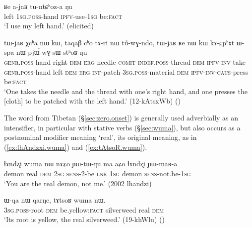 \begin{exe}
\ex \label{ex:Re.ajaR}
\gll ʁe a-jaʁ tu-ntɕʰoz-a ŋu \\
left \textsc{1sg}.\textsc{poss}-hand \textsc{ipfv}-use-\textsc{1sg} be:\textsc{fact} \\
\glt `I use my left hand.' (elicited)
\end{exe}


\begin{exe}
\ex \label{ex:tWjaR.Xcha}
\gll tɯ-jaʁ χcʰa nɯ kɯ, taqaβ cʰo tɤ-ri nɯ tú-wɣ-ndo, tɯ-jaʁ ʁe nɯ kɯ kɤ-ɕpʰɤt ɯ-spa nɯ pjɯ́-wɣ-sɯ-stʰoʁ ŋu \\
\textsc{genr}.\textsc{poss}-hand right \textsc{dem} \textsc{erg} needle \textsc{comit}  \textsc{indef}.\textsc{poss}-thread \textsc{dem} \textsc{ipfv}-\textsc{inv}-take \textsc{genr}.\textsc{poss}-hand left \textsc{dem} \textsc{erg} \textsc{inf}-patch \textsc{3sg}.\textsc{poss}-material \textsc{dem} \textsc{ipfv}-\textsc{inv}-\textsc{caus}-press be:\textsc{fact} \\
\glt `One takes the needle and the thread with one's right hand, and one presses the [cloth] to be patched with the left hand.' (12-kAtsxWb)
()
\end{exe}


The word  from Tibetan  (§\ref{sec:zero.onset}) is generally used adverbially as an intensifier, in particular with stative verbs (§\ref{sec:wuma}), but also occurs as a postnominal modifier meaning `real', its original meaning, as in (\ref{ex:lhAndzxi.wuma}) and (\ref{ex:tAtsoR.wuma}).

\begin{exe}
\ex \label{ex:lhAndzxi.wuma}
\gll ɬɤndʐi wuma nɯ nɤʑo ɲɯ-tɯ-ŋu ma aʑo ɬɤndʐi ɲɯ-maʁ-a \\
demon real \textsc{dem} \textsc{2sg} \textsc{sens}-2-be \textsc{lnk} \textsc{1sg} demon \textsc{sens}-not.be-\textsc{1sg} \\
\glt `You are the real demon, not me.' (2002 lhandzi)
\end{exe}

\begin{exe}
\ex \label{ex:tAtsoR.wuma}
\gll ɯ-qa nɯ qarŋe, tɤtsoʁ wuma nɯ. \\
\textsc{3sg}.\textsc{poss}-root \textsc{dem} be.yellow:\textsc{fact} silverweed real \textsc{dem} \\
\glt `Its root is yellow, the real silverweed.' (19-khWlu)
()
\end{exe}

